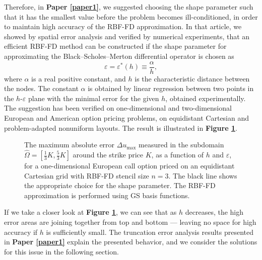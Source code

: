 \documentclass{UUThesisTemplate}
\begin{document}
\par
Therefore, in \textbf{Paper \ref{paper1}}, we suggested choosing the shape parameter such that it has the smallest value before the problem becomes ill-conditioned, in order to maintain high accuracy of the RBF-FD approximation. In that article, we showed by spatial error analysis and verified by numerical experiments, that an efficient RBF-FD method can be constructed if the shape parameter for approximating the Black--Scholes--Merton differential operator is chosen as 
\begin{equation}
\varepsilon=\varepsilon^*(h)\equiv\frac{\alpha}{h},
\label{eq:shape}
\end{equation}
where $\alpha$ is a real positive constant, and $h$ is the characteristic distance between the nodes. The constant $\alpha$ is obtained by linear regression between two points in the $h$-$\varepsilon$ plane with the minimal error for the given $h$, obtained experimentally. The suggestion has been verified on one-dimensional and two-dimensional European and American option pricing problems, on equidistant Cartesian and problem-adapted nonuniform layouts. The result is illustrated in \textbf{Figure \ref{fig:contour1}}.
\begin{figure}[H]
\centering


\caption{The maximum absolute error $\Delta u_{\max}$ measured in the subdomain $\hat\Omega=[\frac{1}{3}K,\frac{5}{3}K]$ around the strike price $K$, as a function of $h$ and $\varepsilon$, for a one-dimensional European call option priced on an equidistant Cartesian grid with RBF-FD stencil size $n=3$. The black line shows the appropriate choice for the shape parameter. The RBF-FD approximation is performed using GS basis functions.}
\label{fig:contour1}
\end{figure}
If we take a closer look at \textbf{Figure \ref{fig:contour1}}, we can see that as $h$ decreases, the high error areas are joining together from top and bottom --- leaving no space for high accuracy if $h$ is sufficiently small. The truncation error analysis results presented in \textbf{Paper \ref{paper1}} explain the presented behavior, and we consider the solutions for this issue in the following section. 
%





%





%
\end{document}
